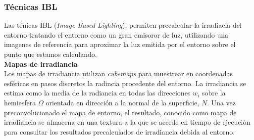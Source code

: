             \subsubsection{T\'ecnicas IBL}
            Las t\'enicas IBL (\textit{Image Based Lighting}), permiten precalcular la irradiacia del entorno tratando el entorno
            como un gran emisoror de luz, utilizando una imagenes de referencia para aproximar la luz emitida por el entorno sobre
            el punto que estamos calculando.\\

            \textbf{Mapas de irradiancia}\\
            Los mapas de irradiancia utilizan \textit{cubemaps} para muestrear en coordenadas esf\'ericas en pasos discretos la radincia
            procedente del entorno. La irradiancia se estima como la media de la radiancia en todas las direcciones $w_i$ sobre la
            hemiesfera $\Omega$ orientada en direcci\'on a la normal de la superficie, $N$. Una vez preconvolucionado el mapa de
            entorno, el resultado, conocido como mapa de irradiancia se almacena en una textura a la que se accede en tiempo
            de ejecuci\'on para consultar los resultados precalculados de irradiancia debida al entorno.


